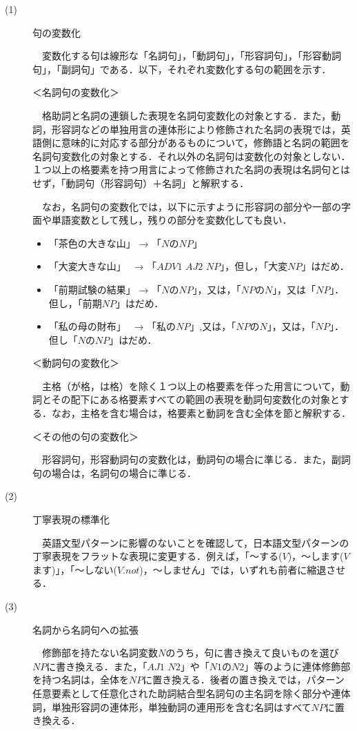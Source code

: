 \documentclass{nlp}
\begin{document}
\begin{description}
\item[(1)] 句の変数化

　変数化する句は線形な「名詞句」，「動詞句」，「形容詞句」，「形容動詞句」，「副詞句」である．以下，それぞれ変数化する句の範囲を示す．

＜名詞句の変数化＞

　格助詞と名詞の連鎖した表現を名詞句変数化の対象とする．また，動詞，形容詞などの単独用言の連体形により修飾された名詞の表現では，英語側に意味的に対応する部分があるものについて，修飾語と名詞の範囲を名詞句変数化の対象とする．それ以外の名詞句は変数化の対象としない．１つ以上の格要素を持つ用言によって修飾された名詞の表現は名詞句とはせず，「動詞句（形容詞句）＋名詞」と解釈する．

　なお，名詞句の変数化では，以下に示すように形容詞の部分や一部の字面や単語変数として残し，残りの部分を変数化しても良い．

\begin{itemize}
\item 「茶色の大きな山」 →  「$N$の$NP$」
\item 「大変大きな山」　 → 「$ADV1$ $AJ2$ $NP$」，但し，「大変$NP$」はだめ．
\item 「前期試験の結果」 → 「$N$の$NP$」，又は，「$NP$の$N$」，又は「$NP$」．但し，「前期$NP$」はだめ．
\item 「私の母の財布」　  →  「私の$NP$」,又は，「$NP$の$N$」，又は，「$NP$」．但し「$N$の$NP$」はだめ．
\end{itemize}

＜動詞句の変数化＞

　主格（が格，は格）を除く１つ以上の格要素を伴った用言について，動詞とその配下にある格要素すべての範囲の表現を動詞句変数化の対象とする．なお，主格を含む場合は，格要素と動詞を含む全体を節と解釈する．

＜その他の句の変数化＞

　形容詞句，形容動詞句の変数化は，動詞句の場合に準じる．また，副詞句の場合は，名詞句の場合に準じる．

\item[(2)]丁寧表現の標準化

　英語文型パターンに影響のないことを確認して，日本語文型パターンの丁寧表現をフラットな表現に変更する．例えば，「〜する($V$)，〜します($V$ます)」，「〜しない($V.not$)，〜しません」では，いずれも前者に縮退させる．

\item[(3)]名詞から名詞句への拡張

　修飾部を持たない名詞変数$N$のうち，句に書き換えて良いものを選び$NP$に書き換える．また，「$AJ1$ $N2$」や「$N1$の$N2$」等のように連体修飾部を持つ名詞は，全体を$NP$に置き換える．後者の置き換えでは，パターン任意要素として任意化された助詞結合型名詞句の主名詞を除く部分や連体詞，単独形容詞の連体形，単独動詞の連用形を含む名詞はすべて$NP$に置き換える．


\end{description}
\end{document}
